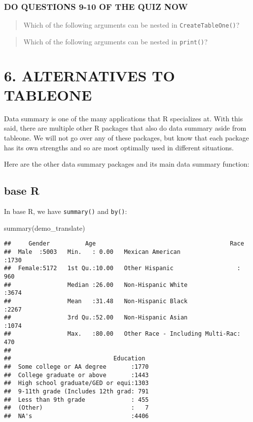 \documentclass[
]{book}
\newenvironment{Shaded}{\begin{snugshade}}{\end{snugshade}}
\newcommand{\FunctionTok}[1]{\textcolor[rgb]{0.00,0.00,0.00}{#1}}
\newcommand{\NormalTok}[1]{#1}
\begin{document}
\hypertarget{do-questions-9-10-of-the-quiz-now-1}{%
\subsubsection{DO QUESTIONS 9-10 OF THE QUIZ NOW}\label{do-questions-9-10-of-the-quiz-now-1}}

\begin{quote}
Which of the following arguments can be nested in \texttt{CreateTableOne()}?
\end{quote}

\begin{quote}
Which of the following arguments can be nested in \texttt{print()}?
\end{quote}

\hypertarget{alternatives-to-tableone}{%
\section{6. ALTERNATIVES TO TABLEONE}\label{alternatives-to-tableone}}

Data summary is one of the many applications that R specializes at. With this said, there are multiple other R packages that also do data summary aside from tableone. We will not go over any of these packages, but know that each package has its own strengths and so are most optimally used in different situations.

Here are the other data summary packages and its main data summary function:

\hypertarget{base-r}{%
\subsection{base R}\label{base-r}}

In base R, we have \texttt{summary()} and \texttt{by()}:

\begin{Shaded}
\begin{Highlighting}[]
\FunctionTok{summary}\NormalTok{(demo\_translate)}
\end{Highlighting}
\end{Shaded}

\begin{verbatim}
##     Gender          Age                                      Race     
##  Male  :5003   Min.   : 0.00   Mexican American                :1730  
##  Female:5172   1st Qu.:10.00   Other Hispanic                  : 960  
##                Median :26.00   Non-Hispanic White              :3674  
##                Mean   :31.48   Non-Hispanic Black              :2267  
##                3rd Qu.:52.00   Non-Hispanic Asian              :1074  
##                Max.   :80.00   Other Race - Including Multi-Rac: 470  
##                                                                       
##                             Education   
##  Some college or AA degree       :1770  
##  College graduate or above       :1443  
##  High school graduate/GED or equi:1303  
##  9-11th grade (Includes 12th grad: 791  
##  Less than 9th grade             : 455  
##  (Other)                         :   7  
##  NA's                            :4406
\end{verbatim}
\end{document}
